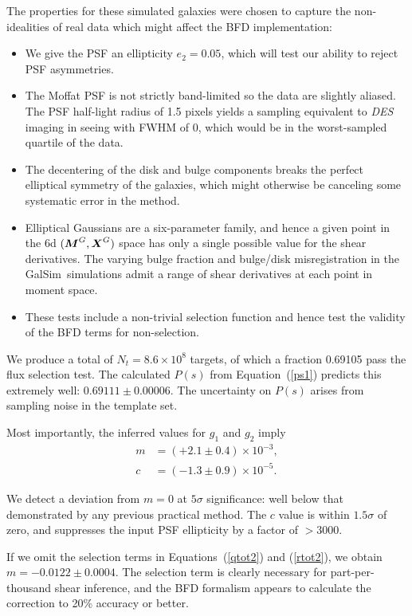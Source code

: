 \documentclass[11pt,preprint,flushrt]{aastex}
\def\eqq#1{Equation~(\ref{#1})}
\newcommand{\vecX}{\mbox{\boldmath $X$}}
\newcommand{\vecM}{\mbox{\boldmath $M$}}
\newcommand{\galsim}{{\sc GalSim}}
\newcommand\edit[1]{#1}
\begin{document}
The properties for these simulated galaxies were chosen 
to capture the non-idealities of real data which might affect the BFD
implementation:
\begin{itemize}
\item We give the PSF an ellipticity $e_{2}=0.05$, which will test our
  ability to reject PSF asymmetries. 
\item The Moffat PSF is not strictly band-limited so the data are
  slightly aliased.  The PSF half-light radius of 1.5 pixels yields a
  sampling equivalent to \emph{DES} imaging in seeing with FWHM of
  0, which would be in the worst-sampled quartile of the data.
\item The decentering of the disk and bulge components breaks the
perfect elliptical symmetry of the galaxies, which might otherwise be
canceling some systematic error in the method.
\item Elliptical Gaussians are a six-parameter family, and hence a
  given point in the 6d $(\vecM^G,\vecX^G)$ space has only a single
  possible value for the shear derivatives.  
  The varying bulge fraction and bulge/disk misregistration in the
  \galsim\ simulations admit a 
  range of shear derivatives at each point in moment space.
\item These tests include a non-trivial selection function and hence
  test the validity of the BFD terms for non-selection.
\end{itemize}

We produce a total of \edit{$N_t=8.6\times10^8$ targets,} of which a fraction
0.69105 pass the flux selection test.  The calculated $P(s)$ from
\eqq{ps1} predicts this extremely well: $0.69111\pm0.00006$.  The
uncertainty on $P(s)$ arises from sampling noise in the template set.

Most importantly, the inferred values for $g_1$ and $g_2$ imply
\begin{align}
\label{results}
m & =\edit{(+2.1\pm0.4)\times10^{-3},} \\
c & =  \edit{(-1.3\pm0.9)\times10^{-5}.}
\end{align}

\edit{We detect a deviation from $m=0$ at $5\sigma$ significance: 
well below that demonstrated by any
  previous practical method.  The $c$ value is within $1.5\sigma$ of
  zero, and suppresses the input PSF ellipticity by a factor of $>3000.$}

If we omit the selection terms in
Equations~(\ref{qtot2}) and (\ref{rtot2}), we obtain \edit{$m=-0.0122\pm0.0004.$}
The selection term is clearly necessary for
part-per-thousand shear inference, and the BFD formalism appears to
calculate the correction to 20\% accuracy or better.
\end{document}
